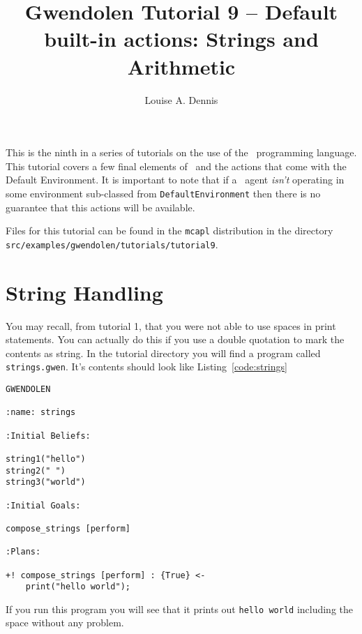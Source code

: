 \documentclass[a4]{article}
\author{Louise A. Dennis}
\title{Gwendolen Tutorial 9 -- Default built-in actions: Strings and Arithmetic}
\begin{document}
\maketitle
This is the ninth in a series of tutorials on the use of the \gwendolen\ programming language.  This tutorial covers a few final elements of \gwendolen\ and the actions that come with the Default Environment.  It is important to note that if a \gwendolen\ agent \emph{isn't} operating in some environment sub-classed from \texttt{DefaultEnvironment} then there is no guarantee that this actions will be available.

Files for this tutorial can be found in the \texttt{mcapl} distribution in the directory \texttt{src/examples/gwendolen/tutorials/tutorial9}.

\section{String Handling}

You may recall, from tutorial 1, that you were not able to use spaces in print statements.  You can actually do this if you use a double quotation to mark the contents as  string.  In the tutorial directory you will find a program called \texttt{strings.gwen}.  It's contents should look like Listing~\ref{code:strings}
\begin{lstlisting}[float,caption=String Printing Program,basicstyle=\sffamily,style=easslisting,language=Gwendolen,label=code:strings]
GWENDOLEN

:name: strings

:Initial Beliefs:

string1("hello")
string2(" ")
string3("world")

:Initial Goals:

compose_strings [perform]

:Plans:

+! compose_strings [perform] : {True} <-
	print("hello world");
\end{lstlisting}
If you run this program you will see that it prints out \texttt{hello world} including the space without any problem.
\end{document}

